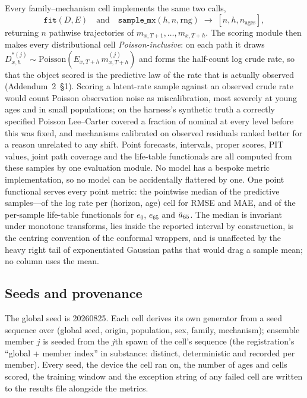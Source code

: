 Every family--mechanism cell implements the same two calls,
\[
  \texttt{fit}(D, E) \quad\text{and}\quad
  \texttt{sample\_mx}(h, n, \text{rng}) \;\to\; [n, h, n_{\text{ages}}],
\]
returning $n$ pathwise trajectories of $m_{x,T+1},\dots,m_{x,T+h}$. The
scoring module then makes every distributional cell \emph{Poisson-inclusive}:
on each path it draws $D^{\ast(j)}_{x,h}\sim\mathrm{Poisson}(E_{x,T+h}\,
m^{(j)}_{x,T+h})$ and forms the half-count log crude rate, so that the
object scored is the predictive law of the rate that is actually observed
(Addendum~2~\S1). Scoring a latent-rate sample against an observed crude
rate would count Poisson observation noise as miscalibration, most severely
at young ages and in small populations; on the harness's synthetic truth a
correctly specified Poisson Lee--Carter covered a fraction of nominal at
every level before this was fixed, and mechanisms calibrated on observed
residuals ranked better for a reason unrelated to any shift. Point
forecasts, intervals, proper scores, PIT values, joint path coverage and
the life-table functionals are all computed from these samples by one
evaluation module. No model has a bespoke metric implementation, so no
model can be accidentally flattered by one. One point functional serves
every point metric: the pointwise median of the predictive samples---of
the log rate per (horizon, age) cell for RMSE and MAE, and of the
per-sample life-table functionals for $e_0$, $e_{65}$ and $\ddot{a}_{65}$. The
median is invariant under monotone transforms, lies inside the reported
interval by construction, is the centring convention of the conformal
wrappers, and is unaffected by the heavy right tail of exponentiated
Gaussian paths that would drag a sample mean; no column uses the mean.

\subsection{Seeds and provenance}

The global seed is 20260825. Each cell derives its own generator from a seed
sequence over (global seed, origin, population, sex, family, mechanism);
ensemble member $j$ is seeded from the $j$th spawn of the cell's sequence
(the registration's ``global + member index'' in substance:
distinct, deterministic and recorded per member). Every seed, the device the cell ran on, the number of
ages and cells scored, the training window and the exception string of any
failed cell are written to the results file alongside the metrics.

